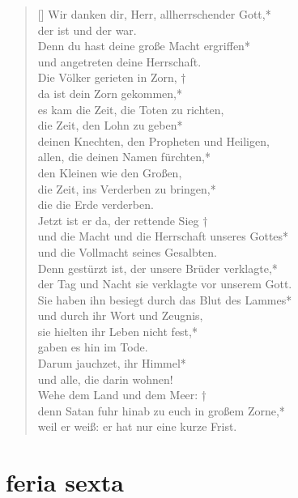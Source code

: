\begin{verse}[\versewidth]
 Wir danken dir, Herr, allherrschender Gott,*\\
der ist und der war.\\ 
\vin Denn du hast deine große Macht ergriffen*\\
\vin und angetreten deine Herrschaft.\\
Die Völker gerieten in Zorn, †\\
da ist dein Zorn gekommen,*\\
es kam die Zeit, die Toten zu richten,\\
\vin die Zeit, den Lohn zu geben*\\
\vin deinen Knechten, den Propheten und Heiligen,\\
allen, die deinen Namen fürchten,*\\
den Kleinen wie den Großen,\\
\vin die Zeit, ins Verderben zu bringen,*\\
\vin die die Erde verderben.\\

Jetzt ist er da, der rettende Sieg †\\
und die Macht und die Herrschaft unseres Gottes*\\
und die Vollmacht seines Gesalbten.\\
\vin Denn gestürzt ist, der unsere Brüder verklagte,*\\
\vin der Tag und Nacht sie verklagte vor unserem Gott.\\
Sie haben ihn besiegt durch das Blut des Lammes*\\
und durch ihr Wort und Zeugnis,\\ 
\vin sie hielten ihr Leben nicht fest,*\\
\vin gaben es hin im Tode.\\
Darum jauchzet, ihr Himmel*\\
und alle, die darin wohnen!\\
\vin Wehe dem Land und dem Meer: †\\
\vin denn Satan fuhr hinab zu euch in großem Zorne,*\\
\vin weil er weiß: er hat nur eine kurze Frist.\\

\end{verse}


\section{feria sexta}

